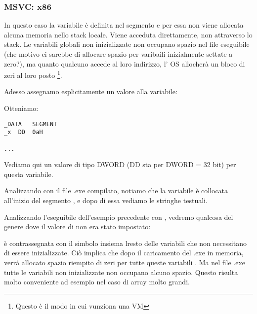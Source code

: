 \subsubsection{MSVC: x86}



In questo caso la variabile  è definita nel segmento  e per essa non viene allocata alcuna memoria nello stack locale. Viene acceduta direttamente, non attraverso lo stack.
Le variabili globali non inizializzate non occupano spazio nel file eseguibile 
(che motivo ci sarebbe di allocare spazio per varibaili inizialmente settate a zero?), 
ma quanto qualcuno accede al loro indirizzo, l' \ac{OS} allocherà un bloco di zeri al loro posto \footnote{Questo è il modo in cui vunziona una \ac{VM} }.

Adesso assegnamo esplicitamente un valore alla variabile:



Otteniamo:

\begin{lstlisting}[style=customasmx86]
_DATA	SEGMENT
_x	DD	0aH

...
\end{lstlisting}

Vediamo qui un valore  di tipo DWORD (DD sta per DWORD = 32 bit) per questa variabile.

Analizzando con \IDA il file .exe compilato, notiamo che la variabile  è collocata all'inizio del segmento , e dopo di essa vediamo le stringhe testuali.

Analizzando l'eseguibile dell'esempio precedente con \IDA, vedremo qualcosa del genere dove il valore di  non era stato impostato:



 è contrassegnata con il simbolo  insiema lresto delle variabili che non necessitano di essere inizializzate.
Ciò implica che dopo il caricamento del .exe in memoria, verrà allocato spazio riempito di zeri per tutte queste variabili .
Ma nel file .exe tutte le variabili non inizializzate non occupano alcuno spazio.
Questo risulta molto conveniente ad esempio nel caso di array molto grandi.



